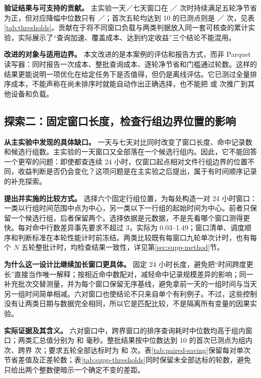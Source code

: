 \textbf{验证结果与可支持的贡献。}
主实验一天／七天窗口在 \MainOneNetN{}／\MainSevenNetN{} 次时持续满足五轮净节省为正，但对应降幅中位数只有 \MainOneNetPct\pct{}／\MainSevenNetPct\pct{}；首次五轮均达到 10\pct{} 的已测点则是 \MainOneTenN{}／\MainSevenTenN{} 次，见表\ref{tab:thresholds}。贡献在于将不同窗口负载与两类判据放入同一套可核查的累计实验，实际展示了“查询加速、覆盖成本、达到约定收益”三个结论不能混用。

\textbf{改进的对象与适用边界。}
本文改进的是本案例的评估和报告方式，而非 Parquet 读写器：同时报告一次成本、整批查询成本、逐轮净节省和门槛通过轮数。这样的结果更能说明一项优化在给定任务下是否值得，但仍是离线评估。它已测过全量排序成本，不能声称在尚未排序时就能自动作出正确选择，也不能把 \MainOneTenN{} 或 \MainSevenTenN{} 次推广到其他设备和负载。

\subsection{探索二：固定窗口长度，检查行组边界位置的影响}
\label{sec:innovation-boundary}
\textbf{从主实验中发现的具体缺口。}
一天与七天对比同时改变了窗口长度、命中记录数和候选行组数。主实验的一天窗口又全部落在一个候选行组内。因此，它不能回答一个更窄的问题：即使都查连续 24 小时，仅窗口起点相对文件行组边界的位置不同，收益判断是否仍会变化？这项问题是在主实验之后提出，属于有时间顺序记录的补充探索。

\textbf{提出并实施的比较方式。}
选择六个固定行组位置，为每处构造一对 24 小时窗口：一类以行组时间范围中点为中心，另一类以下一行组的起始时间为中心。前者只保留一个候选行组，后者保留两个。选择依据是元数据，不是先看哪个窗口测得更快。每对命中行数差异事先要求不超过 3\pct{}，实际为 0.03\pct--1.49\pct；窗口清单、调度顺序和判断标准在本轮性能计时前冻结。两类比较既有每窗口九轮单次计时，也有每个 $N$ 五轮整批计时，均检查结果一致性，详见第\ref{sec:supp-method}节。

\textbf{为什么这一设计比继续加长窗口更具体。}
固定 24 小时长度，避免把“时间跨度更长”直接当作唯一解释；按相近命中数配对，减轻命中记录规模差异的影响；同一补充批次交替测量，并为每个窗口保留无序基线，避免拿前一天的一组时间与当天另一组时间简单相减。六对窗口也使结论不只来自单个有利例子。不过，这些控制没有让两类日期与数据完全相同，所以它是匹配比较，不是隔离所有变量的因果实验。

\textbf{实际证据及其含义。}
六对窗口中，跨界窗口的排序查询耗时中位数均高于组内窗口；两类汇总值分别为 \SuppCrossQueryMs{} 和 \SuppInsideQueryMs{} 毫秒。整批结果按中位数达到 10\pct{} 的首次已测点为组内 \SuppInsideMedianN{} 次、跨界 \SuppCrossMedianN{} 次；要求五轮全部达标时为 \SuppInsideAllN{} 和 \SuppCrossAllN{} 次。表\ref{tab:paired-saving}保留每对单次节省差值及正差轮数；表\ref{tab:supp-thresholds}同时保留未全部达标的轮数，避免只给出两个整数便暗示一个确定不变的差距。

